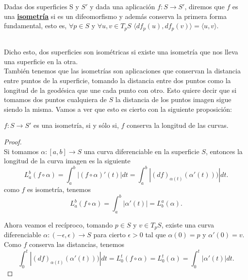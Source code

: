 \begin{definicion}\label{def:isom} %
	Dadas dos superficies S y $S'$ y dada una aplicación $f : S \longrightarrow S'$, diremos que $f$ es una \underline{\textbf{isometría}} si es un difeomorfismo y además conserva la primera forma fundamental, esto es, $\forall p \in S$ y $\forall u,v \in T_p S$ $\langle df_p(u), df_p(v)\rangle = \langle u, v\rangle$.
\end{definicion}
${ }$\\

Dicho esto, dos superficies son isométricas si existe una isometría que nos lleva una superficie en la otra.
	${}$\\
	
También tenemos que las isometrías son aplicaciones que conservan la distancia entre puntos de la superficie, tomando la distancia entre dos puntos como la longitud de la geodésica que une cada punto con otro. Esto quiere decir que si tomamos dos puntos cualquiera de $S$ la distancia de los puntos imagen sigue siendo la misma. Vamos a ver que esto es cierto con la siguiente proposición:
${ }$\\

\begin{proposicion}
	$f : S \to S'$ es una isometría, si y sólo si, $f$ conserva la longitud de las curvas.
\end{proposicion}

\begin{proof}
	${}$\\
	
	Si tomamos $\alpha : [a,b] \to S$ una curva diferenciable en la superficie $S$, entonces la longitud de la curva imagen es la siguiente
	\[
	L^{b}_{a} (f \circ \alpha) = \int^{b}_{a} |(f \circ \alpha)'(t)| dt = \int^{b}_{a} |(df)_{\alpha(t)}(\alpha'(t)))| dt.
	\]
	como $f$ es isometría, tenemos
	\[
	L^{b}_{a} (f \circ \alpha) = \int^{b}_{a} |\alpha'(t)| = L^{a}_{b} (\alpha).
	\]
	
	Ahora veamos el recíproco, tomando $p \in S$ y $v \in T_p S$, existe una curva diferenciable $\alpha : (-\epsilon, \epsilon) \to S$ para cierto $\epsilon > 0$ tal que $\alpha(0) = p$ y $\alpha'(0) = v$. Como $f$ conserva las distancias, tenemos
	\[
	\int^{t}_{0}|(df)_{\alpha(t)}(\alpha'(t)))| dt = L^{t}_{0} (f \circ \alpha) = L^{t}_{0}(\alpha) = \int^{t}_{0} |\alpha'(t)|dt.
	\]
	
\end{proof}
${ }$\\


